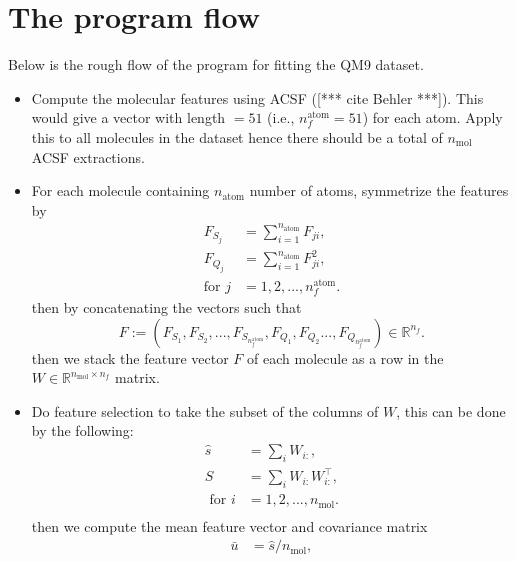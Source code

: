 \documentclass[12pt]{article}
\def\att{                    %
        \marginpar[ \hspace*{\fill} \raisebox{-0.2em}{\rule{2mm}{1.2em}} ]
        {\raisebox{-0.2em}{\rule{2mm}{1.2em}} }
        }
\def\at#1{[*** \att #1 ***]}  %
\begin{document}
\section{The program flow}
Below is the rough flow of the program for fitting the QM9 dataset.
\begin{itemize}
    \item Compute the molecular features using ACSF (\at{cite Behler}). This would give a vector with length $= 51$ (i.e., $n^\text{atom}_f = 51$) for each atom. Apply this to all molecules in the dataset hence there should be a total of $n_\text{mol}$ ACSF extractions.
    \item For each molecule containing $n_\text{atom}$ number of atoms, symmetrize the features by
        \begin{equation}
            \begin{split}
                F_{S_j} &= \sum_{i=1}^{n_{\text{atom}}} F_{ji},\\
                F_{Q_j} &= \sum_{i=1}^{n_{\text{atom}}} F_{ji}^2, \\
                \text{for }j &= 1,2,..., n^\text{atom}_f. 
            \end{split}
        \end{equation}
        then by concatenating the vectors such that
        \begin{equation}
            F := (F_{S_1}, F_{S_2}, ..., F_{S_{n^\text{atom}_f}}, F_{Q_1},F_{Q_2} ..., F_{Q_{n^\text{atom}_f}}) \in \mathbb{R}^{n_f}.
        \end{equation}
    	then we stack the feature vector $F$ of each molecule as a row in the $W \in \mathbb{R}^{n_\text{mol} \times n_f}$ matrix.
    \item Do feature selection to take the subset of the columns of $W$, this can be done by the following:
	    \begin{equation}
			\begin{split}
				\hat{s} &= \sum_i W_{i:}, \\
				S &= \sum_i W_{i:}W_{i:}^\top, \\
				\text{ for } i &= 1,2,...,n_{\text{mol}}. \\
			\end{split}
	    \end{equation}
		then we compute the mean feature vector and covariance matrix
		\begin{equation}
			\begin{split}
				\bar{u} &= \hat{s}/n_\text{mol}, \\

\end{split}
\end{equation}
\end{itemize}
\end{document}
